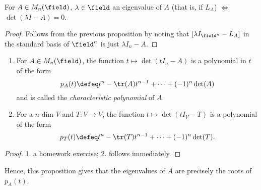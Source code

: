 \begin{corollary}
    For $A \in M_n(\field)$, $\lambda \in \field$ an eigenvalue of $A$ (that is, if $L_A$) $\iff$ $\det(\lambda I - A) = 0$.
\end{corollary}

\begin{proof}
    Follows from the previous proposition by noting that $[\lambda I_{\field^n} - L_A]$ in the standard basis of $\field^n$ is just $\lambda I_n - A$.
\end{proof}

\begin{proposition}
    \begin{enumerate}
        \item For $A \in M_n(\field)$, the function $t \mapsto \det(tI_n - A)$ is a polynomial in $t$ of the form \[
        p_A(t) \defeq t^n - \tr(A)t^{n-1} + \cdots + (-1)^n \det(A)
        \]
        and is called the \emph{characteristic polynomial} of $A$.
        \item For a $n$-dim $V$ and $T : V \to V$, the function $t \mapsto \det(t I_V - T)$ is a polynomial of the form \[
            p_T(t) \defeq t^n - \tr(T)t^{n-1} + \cdots + (-1)^n \det(T).
        \]
    \end{enumerate}
\end{proposition}

\begin{proof}
    1. a homework exercise; 2. follows immediately.
\end{proof}
Hence, this proposition gives that the eigenvalues of $A$ are precisely the roots of $p_A(t)$.

